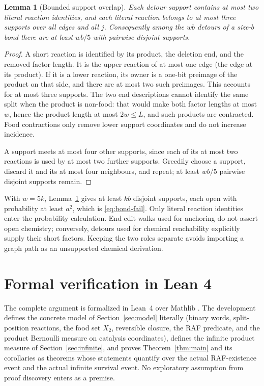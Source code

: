 \documentclass[11pt,reqno]{amsart}
\theoremstyle{plain}
\newtheorem{lemma}[theorem]{Lemma}
\theoremstyle{definition}
\theoremstyle{remark}
\numberwithin{equation}{section}
\begin{document}
\begin{lemma}[Bounded support overlap]\label{lem:support-overlap}
Each detour support contains at most two literal reaction identities, and each literal reaction belongs to at most three supports over all edges and all $j$. Consequently among the $wb$ detours of a size-$b$ bond there are at least $wb/5$ with pairwise disjoint supports.
\end{lemma}

\begin{proof}
A short reaction is identified by its product, the deletion end, and the removed factor length. It is the upper reaction of at most one edge (the edge at its product). If it is a lower reaction, its owner is a one-bit preimage of the product on that side, and there are at most two such preimages. This accounts for at most three supports. The two end descriptions cannot identify the same split when the product is non-food: that would make both factor lengths at most $w$, hence the product length at most $2w\le L$, and such products are contracted. Food contractions only remove lower support coordinates and do not increase incidence.

A support meets at most four other supports, since each of its at most two reactions is used by at most two further supports. Greedily choose a support, discard it and its at most four neighbours, and repeat; at least $wb/5$ pairwise disjoint supports remain.
\end{proof}

With $w=5k$, Lemma~\ref{lem:support-overlap} gives at least $kb$ disjoint supports, each open with probability at least $a^2$, which is \eqref{eq:bond-fail}. Only literal reaction identities enter the probability calculation. End-edit walks used for anchoring do not assert open chemistry; conversely, detours used for chemical reachability explicitly supply their short factors. Keeping the two roles separate avoids importing a graph path as an unsupported chemical derivation.

\section{Formal verification in Lean 4}\label{app:lean}

The complete argument is formalized in Lean~4 \cite{demoura2021lean4} over Mathlib \cite{mathlib2020}. The development defines the concrete model of Section~\ref{sec:model} literally (binary words, split-position reactions, the food set $X_2$, reversible closure, the RAF predicate, and the product Bernoulli measure on catalysis coordinates), defines the infinite product measure of Section~\ref{sec:infinite}, and proves Theorem~\ref{thm:main} and its corollaries as theorems whose statements quantify over the actual RAF-existence event and the actual infinite survival event. No exploratory assumption from proof discovery enters as a premise.
\end{document}
